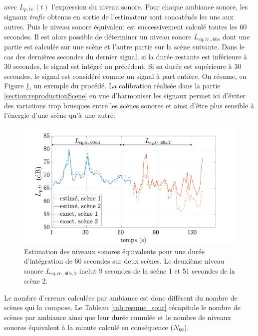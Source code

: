 avec $L_{p,tr.}(t)$ l'expression du niveau sonore.
Pour chaque ambiance sonore, les signaux \textit{trafic} obtenus en sortie de l'estimateur sont concaténés les uns aux autres. Puis le niveau sonore équivalent est successivement calculé toutes les 60 secondes. Il est alors possible de déterminer un niveau sonore $L_{eq,tr.,60s}$ dont une partie est calculée sur une scène et l'autre partie sur la scène suivante. Dans le cas des dernières secondes du dernier signal, si la durée restante est inférieure à 30 secondes, le signal est intégré au précédent. Si sa durée est supérieure à 30 secondes, le signal est considéré comme un signal à part entière. On résume, en Figure \ref{fig:exempe_mae60}, un exemple du procédé. La calibration réalisée dans la partie \ref{section:reproductionScene} en vue d'harmoniser les signaux permet ici d'éviter des variations trop brusques entre les scènes sonores et ainsi d'être plus sensible à l'énergie d'une scène qu'à une autre.

\begin{figure}[h!]
\centering
\includegraphics[width=.9\linewidth]{./figures/resultats/Lp_mae.pdf}
\caption{Estimation des niveaux sonores équivalents pour une durée d'intégration de 60 secondes sur deux scènes. Le deuxième niveau sonore $L_{eq,tr.,60s,2}$ inclut 9 secondes de la scène 1 et 51 secondes de la scène 2.}
\label{fig:exempe_mae60}
\end{figure}

Le nombre d'erreurs calculées par ambiance est donc différent du nombre de scènes qui la compose. Le Tableau \ref{tab:resume_sour} récapitule le nombre de scènes par ambiance ainsi que leur durée cumulée et le nombre de niveaux sonores équivalent à la minute calculé en conséquence ($N_{60}$). 

